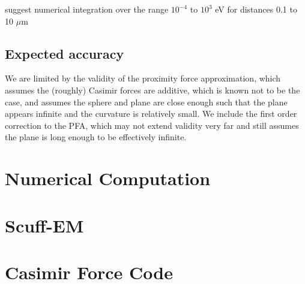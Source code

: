 \documentclass[11pt]{article}
\begin{document}
\citet{Lambrecht} suggest numerical integration over the range $10^{-4}$ to $10^{3}$ eV for distances 0.1 to 10 $\mu$m

\subsection{Expected accuracy}
We are limited by the validity of the proximity force approximation, which assumes the (roughly) Casimir forces are additive, which is known not to be the case, and assumes the sphere and plane are close enough such that the plane appears infinite and the curvature is relatively small. We include the first order correction to the PFA, which may not extend validity very far and still assumes the plane is long enough to be effectively infinite.

\section{Numerical Computation}



\pagebreak
\appendix
\section{Scuff-EM}
\section{Casimir Force Code}



\end{document}
